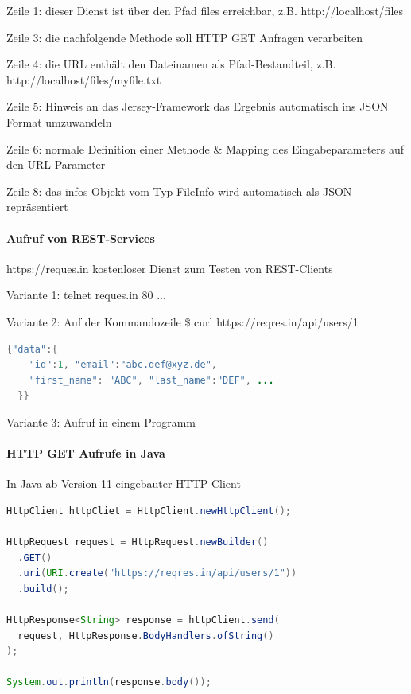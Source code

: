 \documentclass[10pt]{article}
\begin{document}
\begin{itemize*}
  \item Zeile 1: dieser Dienst ist über den Pfad files erreichbar,
  z.B. http://localhost/files
  \item Zeile 3: die nachfolgende Methode soll HTTP GET Anfragen
  verarbeiten
  \item Zeile 4: die URL enthält den Dateinamen als
  Pfad-Bestandteil, z.B.
  http://localhost/files/myfile.txt
  \item Zeile 5: Hinweis an das Jersey-Framework das Ergebnis
  automatisch ins JSON Format umzuwandeln
  \item Zeile 6: normale Definition einer Methode \& Mapping des
  Eingabeparameters auf den URL-Parameter
  \item Zeile 8: das infos Objekt vom Typ FileInfo wird
  automatisch als JSON repräsentiert
\end{itemize*}

\paragraph{Aufruf von REST-Services}

https://reques.in kostenloser Dienst zum Testen von REST-Clients
\begin{itemize*}
  \item Variante 1: telnet reques.in 80 ...
  \item Variante 2: Auf der Kommandozeile \newline
  \$ curl https://reqres.in/api/users/1
  \begin{lstlisting}[language=java]
  {"data":{
    "id":1, "email":"abc.def@xyz.de",
    "first_name": "ABC", "last_name":"DEF", ...
  }}
  \end{lstlisting}
  \item Variante 3: Aufruf in einem Programm
\end{itemize*}

\paragraph{HTTP GET Aufrufe in Java}

In Java ab Version 11 eingebauter HTTP Client
\begin{lstlisting}[language=java]
HttpClient httpCliet = HttpClient.newHttpClient();

HttpRequest request = HttpRequest.newBuilder()
  .GET()
  .uri(URI.create("https://reqres.in/api/users/1"))
  .build();

HttpResponse<String> response = httpClient.send(
  request, HttpResponse.BodyHandlers.ofString()
);

System.out.println(response.body());
\end{lstlisting}
\end{document}
